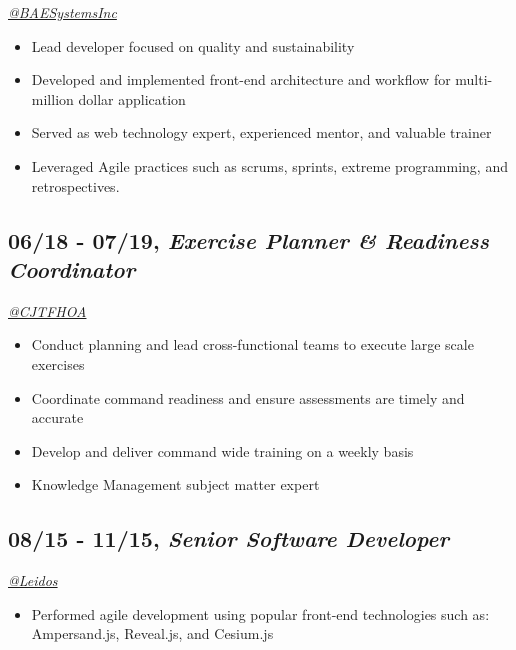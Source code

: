 \documentclass[10pt]{article}
\def\tightlist{}
\begin{document}
\emph{\href{https://twitter.com/BAESystemsInc}{@BAESystemsInc}}

\begin{itemize}
\tightlist
\item
  Lead developer focused on quality and sustainability
\item
  Developed and implemented front-end architecture and workflow for
  multi-million dollar application
\item
  Served as web technology expert, experienced mentor, and valuable
  trainer
\item
  Leveraged Agile practices such as scrums, sprints, extreme
  programming, and retrospectives.
\end{itemize}

\hypertarget{exercise-planner-readiness-coordinator}{%
\subsection{\texorpdfstring{06/18 - 07/19, \textbf{\emph{Exercise
Planner \& Readiness
Coordinator}}}{06/18 - 07/19, Exercise Planner \& Readiness Coordinator}}\label{exercise-planner-readiness-coordinator}}

\emph{\href{https://twitter.com/CJTFHOA}{@CJTFHOA}}

\begin{itemize}
\tightlist
\item
  Conduct planning and lead cross-functional teams to execute large
  scale exercises
\item
  Coordinate command readiness and ensure assessments are timely and
  accurate
\item
  Develop and deliver command wide training on a weekly basis
\item
  Knowledge Management subject matter expert
\end{itemize}

\hypertarget{senior-software-developer}{%
\subsection{\texorpdfstring{08/15 - 11/15, \textbf{\emph{Senior Software
Developer}}}{08/15 - 11/15, Senior Software Developer}}\label{senior-software-developer}}

\emph{\href{https://twitter.com/LeidosInc}{@Leidos}}

\begin{itemize}
\tightlist
\item
  Performed agile development using popular front-end technologies such
  as: Ampersand.js, Reveal.js, and Cesium.js
\end{itemize}
\end{document}
